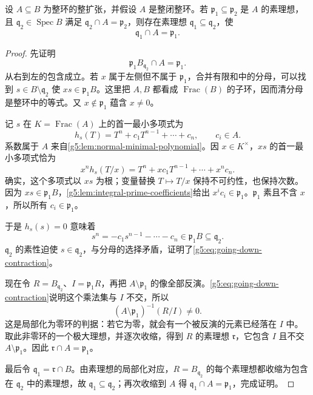 \begin{theorem}
\label{g5:thm:going-down}
	设 \(A\subseteq B\) 为整环的整扩张，并假设 \(A\) 是整闭整环。若 \(\mathfrak p_1\subseteq\mathfrak p_2\) 是 \(A\) 的素理想，且 \(\mathfrak q_2\in\operatorname{Spec}B\) 满足 \(\mathfrak q_2\cap A=\mathfrak p_2\)，则存在素理想 \(\mathfrak q_1\subseteq\mathfrak q_2\)，使
	\[
		\mathfrak q_1\cap A=\mathfrak p_1.
	\]
\end{theorem}
\begin{proof}
	先证明
	\begin{equation}
	\label{g5:eq:going-down-contraction}
		\mathfrak p_1B_{\mathfrak q_2}\cap A=\mathfrak p_1.
	\end{equation}
	从右到左的包含成立。若 \(x\) 属于左侧但不属于 \(\mathfrak p_1\)，合并有限和中的分母，可以找到 \(s\in B\setminus\mathfrak q_2\) 使 \(xs\in\mathfrak p_1B\)。这里把 \(A,B\) 都看成 \(\operatorname{Frac}(B)\) 的子环，因而清分母是整环中的等式。又 \(x\notin\mathfrak p_1\) 蕴含 \(x\ne0\)。

	记 \(s\) 在 \(K=\operatorname{Frac}(A)\) 上的首一最小多项式为
	\[
		h_s(T)=T^n+c_1T^{n-1}+\cdots+c_n,\qquad c_i\in A.
	\]
	系数属于 \(A\) 来自\cref{g5:lem:normal-minimal-polynomial}。因 \(x\in K^\times\)，\(xs\) 的首一最小多项式恰为
	\[
		x^n h_s(T/x)
		=T^n+xc_1T^{n-1}+\cdots+x^nc_n.
	\]
	确实，这个多项式以 \(xs\) 为根；变量替换 \(T\mapsto T/x\) 保持不可约性，也保持次数。因为 \(xs\in\mathfrak p_1B\)，\cref{g5:lem:integral-prime-coefficients}给出 \(x^ic_i\in\mathfrak p_1\)。\(\mathfrak p_1\) 素且不含 \(x\)，所以所有 \(c_i\in\mathfrak p_1\)。

	于是 \(h_s(s)=0\) 意味着
	\[
		s^n=-c_1s^{n-1}-\cdots-c_n
		\in\mathfrak p_1B\subseteq\mathfrak q_2.
	\]
	\(\mathfrak q_2\) 的素性迫使 \(s\in\mathfrak q_2\)，与分母的选择矛盾，证明了\eqref{g5:eq:going-down-contraction}。

	现在令 \(R=B_{\mathfrak q_2}\)、\(I=\mathfrak p_1R\)，再把 \(A\setminus\mathfrak p_1\) 的像全部反演。\eqref{g5:eq:going-down-contraction}说明这个乘法集与 \(I\) 不交，所以
	\[
		(A\setminus\mathfrak p_1)^{-1}(R/I)\ne0.
	\]
	这是局部化为零环的判据：若它为零，就会有一个被反演的元素已经落在 \(I\) 中。取此非零环的一个极大理想，并逐次收缩，得到 \(R\) 的素理想 \(\mathfrak r\)，它包含 \(I\) 且不交 \(A\setminus\mathfrak p_1\)。因此 \(\mathfrak r\cap A=\mathfrak p_1\)。

	最后令 \(\mathfrak q_1=\mathfrak r\cap B\)。由素理想的局部化对应，\(R=B_{\mathfrak q_2}\) 的每个素理想都收缩为包含在 \(\mathfrak q_2\) 中的素理想，故 \(\mathfrak q_1\subseteq\mathfrak q_2\)；再次收缩到 \(A\) 得 \(\mathfrak q_1\cap A=\mathfrak p_1\)，完成证明。
\end{proof}


